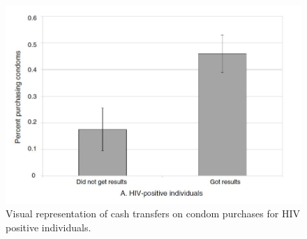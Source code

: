 \documentclass{beamer}
\begin{document}
\begin{frame}[plain]

  \begin{figure}[htb]\centering
    \includegraphics[scale=0.5]{./lecture_includes/FigC.jpg}
    \caption{Visual representation of cash transfers on condom purchases for HIV positive individuals.}
    \label{fig:thorntoncondomfig}
  \end{figure}

\end{frame}
\end{document}
